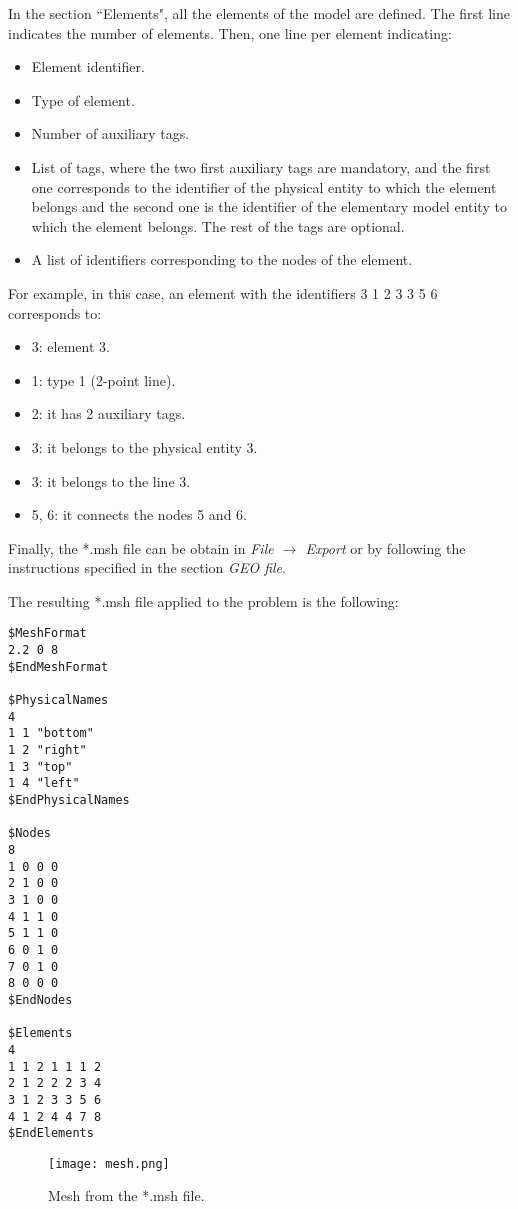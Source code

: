 \documentclass[A4]{article}
\begin{document}
In the section ``Elements", all the elements of the model are defined. The first line indicates the number of elements. Then, one line per element indicating:

\begin{itemize}
	\item Element identifier.
	\item Type of element.
	\item Number of auxiliary tags.
	\item List of tags, where the two first auxiliary tags are mandatory, and the first one corresponds to the identifier of the physical entity to which the element belongs and the second one is the identifier of the elementary model entity to which the element belongs. The rest of the tags are optional.
	\item A list of identifiers corresponding to the nodes of the element.
\end{itemize}

For example, in this case, an element with the identifiers 3 1 2 3 3 5 6 corresponds to:

\begin{itemize}
	\item 3: element 3.
	\item 1: type 1 (2-point line).
	\item 2: it has 2 auxiliary tags.
	\item 3: it belongs to the physical entity 3.
	\item 3: it belongs to the line 3.
	\item 5, 6: it connects the nodes 5 and 6.
\end{itemize} 

Finally, the *.msh file can be obtain in \textit{File $\to$ Export} or by following the instructions specified in the section \textit{GEO file}.

The resulting *.msh file applied to the problem is the following:

\begin{Verbatim}
$MeshFormat
2.2 0 8
$EndMeshFormat

$PhysicalNames
4
1 1 "bottom"
1 2 "right"
1 3 "top"
1 4 "left"
$EndPhysicalNames

$Nodes
8
1 0 0 0
2 1 0 0
3 1 0 0
4 1 1 0
5 1 1 0
6 0 1 0
7 0 1 0
8 0 0 0
$EndNodes

$Elements
4
1 1 2 1 1 1 2
2 1 2 2 2 3 4
3 1 2 3 3 5 6
4 1 2 4 4 7 8
$EndElements
\end{Verbatim}

\begin{figure}[h]
	\centering
	\texttt{[image: mesh.png]}
	\caption{Mesh from the *.msh file.}
	\label{fig:mesh}
\end{figure}
\end{document}
